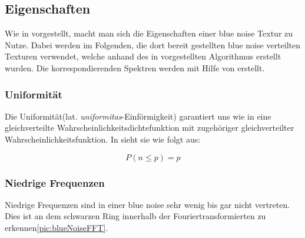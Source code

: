 \subsection{Eigenschaften}

Wie in \cite{Pet17} vorgestellt, macht man sich die Eigenschaften einer
blue noise Textur zu Nutze. Dabei werden im Folgenden, die dort bereit 
gestellten blue noise verteilten Texturen verwendet, welche anhand des in
\cite{ulichney1993void} vorgestellten Algorithmus erstellt wurden.
Die korrespondierenden Spektren werden mit Hilfe von \cite{FFTProgWeb} erstellt.

\subsubsection{Uniformität}
Die Uniformität(lat. \textit{uniformitas}-Einförmigkeit) garantiert uns 
wie in \cite{3288} eine gleichverteilte Wahrscheinlichkeitsdichtefunktion
mit zugehöriger gleichverteilter Wahrscheinlichkeitsfunktion. In \cite{Pet17}
sieht sie wie folgt aus: 

\begin{equation}\label{eq:uniformität}
    P(n \leq p) = p
\end{equation}

\cite{kiencke2009signale}

\subsubsection{Niedrige Frequenzen}
Niedrige Frequenzen sind in einer blue noise sehr wenig bis gar nicht 
vertreten. Dies ist an dem schwarzen Ring innerhalb der Fouriertransformierten
zu erkennen\ref{pic:blueNoiseFFT}.

